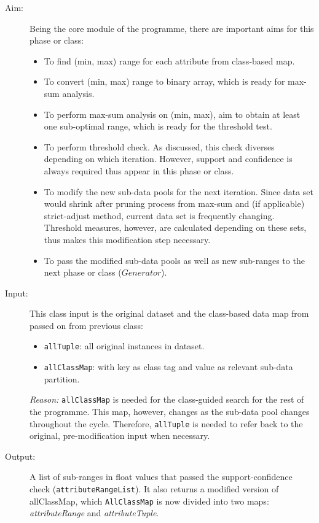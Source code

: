 \begin{description}

\item[Aim: ] Being the core module of the programme, there are important aims for this phase or class:
\begin{itemize}
	\item{To find (min, max) range for each attribute from class-based map.} 
	\item{To convert (min, max) range to binary array, which is ready for max-sum analysis.} 
	\item{To perform max-sum analysis on (min, max), aim to obtain at least one sub-optimal range, which is ready for the threshold test.} 
	\item{To perform threshold check. As discussed, this check diverses depending on which iteration. However, support and confidence is always required thus appear in this phase or class.} 
	\item{To modify the new sub-data pools for the next iteration. Since data set would shrink after pruning process from max-sum and (if applicable) strict-adjust method, current data set is frequently changing. Threshold measures, however, are calculated depending on these sets, thus makes this modification step necessary.} 
	\item{To pass the modified sub-data pools as well as new sub-ranges to the next phase or class ($Generator$).} 
\end{itemize}


\item[Input: ] This class input is the original dataset and the class-based data map from passed on from previous class:
\begin{itemize}
	\item{\texttt{allTuple}:  all original instances in dataset.} 
	\item{\texttt{allClassMap}: with key as class tag and value as relevant sub-data partition.}
\end{itemize}

\textit{Reason: } \texttt{allClassMap} is needed for the class-guided search for the rest of the programme. This map, however, changes as the sub-data pool changes throughout the cycle. Therefore, \texttt{allTuple} is needed to refer back to the original, pre-modification input when necessary.

\item[Output: ] A list of sub-ranges in float values that passed the support-confidence check (\texttt{attributeRangeList}). It also returns a modified version of allClassMap, which \texttt{AllClassMap} is now divided into two maps: \textit{attributeRange} and \textit{attributeTuple}.
  

\end{description}
